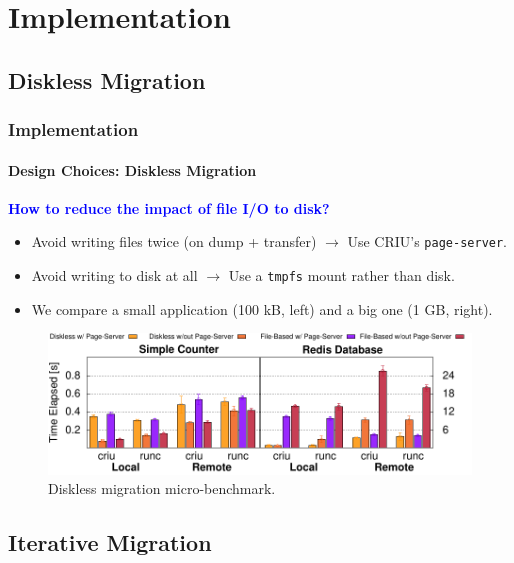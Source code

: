 \documentclass[9pt,    %
    english,            %
    xcolor=table,       %
    envcountsect,        %
    aspectratio=169     %
]{beamer}
\begin{document}
\section{Implementation}

\subsection{Diskless Migration}

\begin{frame}
    \frametitle{Implementation}
    \framesubtitle{Design Choices: Diskless Migration}

    \vspace{10pt}

    \textbf{\textcolor{blue}{How to reduce the impact of file I/O to disk?}}
    \begin{itemize}
        \item Avoid writing files twice (on dump + transfer) $\rightarrow$ Use CRIU's \texttt{page-server}. 
        \item Avoid writing to disk at all $\rightarrow$ Use a \texttt{tmpfs} mount rather than disk.
        \item We compare a small application (100 kB, left) and a big one (1 GB, right).
    \end{itemize}

    \vspace{-5pt}

    \begin{figure}
        \centering
        \includegraphics[width=.75\textwidth]{./figs/diskless_migration_microbenchmark.pdf}
        \caption{Diskless migration micro-benchmark.\label{fig:diskless-microbecnhmark}}
    \end{figure}
    
\end{frame}

\subsection{Iterative Migration}
\end{document}
